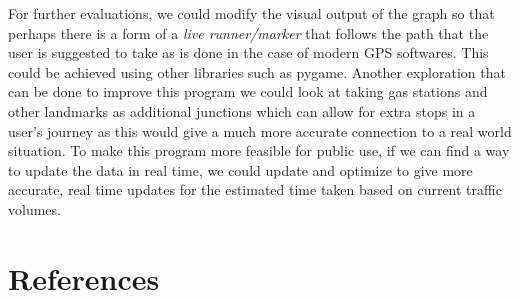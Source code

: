 \documentclass[fontsize=11pt]{IEEEtran}
\begin{document}
For further evaluations, we could modify the visual output of the graph so that perhaps there is a form of a \textit{live runner/marker} that follows the path that the user is suggested to take as is done in the case of modern GPS softwares. This could be achieved using other libraries such as pygame. Another exploration that can be done to improve this program we could look at taking gas stations and other landmarks as additional junctions which can allow for extra stops in a user's journey as this would give a much more accurate connection to a real world situation. To make this program more feasible for public use, if we can find a way to update the data in real time, we could update and optimize to give more accurate, real time updates for the estimated time taken based on current traffic volumes.

\vspace{\baselineskip}
\section{References}\par
\end{document}
